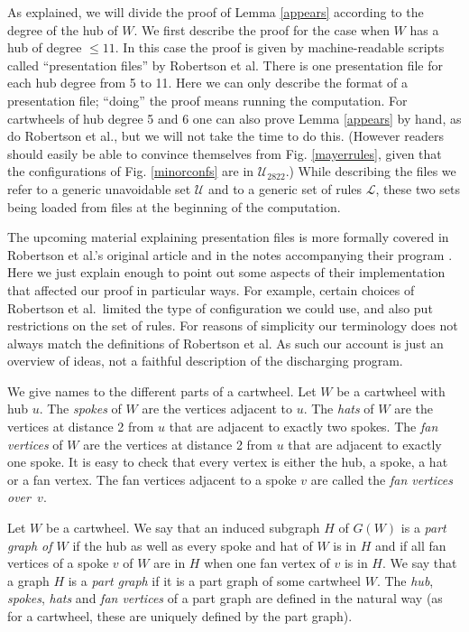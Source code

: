 \documentclass[11pt]{article}
\newcommand{\mcal}{\mathcal}
\newcommand{\ncmath}{2822}
\begin{document}
As explained, we will divide the proof of Lemma \ref{appears} according to the degree of the hub of $W$. We first describe the proof for the case when $W$ has a hub of degree $\leq 11$. In this case the proof is given by machine-readable scripts called ``presentation files'' by Robertson et al. There is one presentation file for each hub degree from 5 to 11. Here we can only describe the format of a presentation file;
``doing'' the proof means running the computation. For cartwheels of hub degree 5 and 6 one can also prove Lemma \ref{appears} by hand, as do Robertson et al., but we will not take the time to do this. (However readers should easily be able to convince themselves from Fig$.$ \ref{mayerrules}, given that the configurations of Fig$.$ \ref{minorconfs} are in $\mcal{U}_{\ncmath}$.) While describing the files we refer to a generic unavoidable set $\mcal{U}$ and to a generic set of rules $\mcal{L}$, these two sets being loaded from files at the beginning of the computation.

The upcoming material explaining presentation files is more formally covered in Robertson et al.'s original article and in the notes accompanying their program \cite{rsst, discharge}. Here we just explain enough to point out some aspects of their implementation that affected our proof in particular ways. For example, certain choices of Robertson et al.~limited the type of configuration we could use, and also put restrictions on the set of rules. For reasons of simplicity our terminology does not always match the definitions of Robertson et al. As such our account is just an overview of ideas, not a faithful description of the discharging program.

We give names to the different parts of a cartwheel. Let $W$ be a cartwheel with hub $u$. The \emph{spokes} of $W$ are the vertices adjacent to $u$. The \emph{hats} of $W$ are the vertices at distance 2 from $u$ that are adjacent to exactly two spokes. The \emph{fan vertices} of $W$ are the vertices at distance 2 from $u$ that are adjacent to exactly one spoke. It is easy to check that every vertex is either the hub, a spoke, a hat or a fan vertex. The fan vertices adjacent to a spoke $v$ are called the \emph{fan vertices over~$v$}.

Let $W$ be a cartwheel. 
We say that an induced subgraph $H$ of $G(W)$ is a \emph{part graph of $W$} if the hub as well as every spoke and hat of $W$ is in $H$ and if all fan vertices of a spoke $v$ of $W$ are in $H$ when one fan vertex of $v$ is in $H$. 
We say that a graph $H$ is a \emph{part graph} if it is a part graph of some cartwheel $W$. 
The \emph{hub}, \emph{spokes}, \emph{hats} and \emph{fan vertices} of a part graph are defined in the natural way (as for a cartwheel, these are uniquely defined by the part graph).
\end{document}
